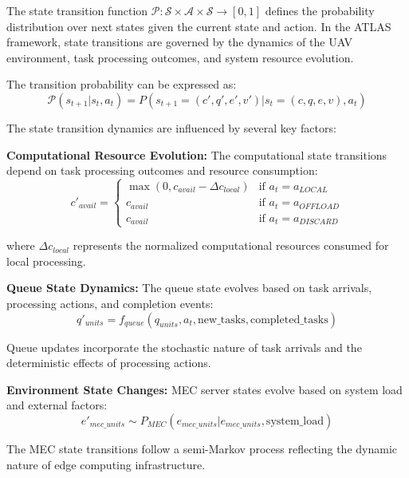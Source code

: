 \documentclass[journal]{IEEEtran}
\begin{document}
The state transition function $\mathcal{P}: \mathcal{S} \times \mathcal{A} \times \mathcal{S} \rightarrow [0,1]$ defines the probability distribution over next states given the current state and action. In the ATLAS framework, state transitions are governed by the dynamics of the UAV environment, task processing outcomes, and system resource evolution.

The transition probability can be expressed as:
\begin{equation}
\mathcal{P}(s_{t+1}|s_t, a_t) = P(s_{t+1} = (c', q', e', v')|s_t = (c, q, e, v), a_t)
\end{equation}

The state transition dynamics are influenced by several key factors:

\textbf{Computational Resource Evolution:} The computational state transitions depend on task processing outcomes and resource consumption:
\begin{equation}
c'_{avail} = \begin{cases}
\max(0, c_{avail} - \Delta c_{local}) & \text{if } a_t = a_{LOCAL} \\
c_{avail} & \text{if } a_t = a_{OFFLOAD} \\
c_{avail} & \text{if } a_t = a_{DISCARD}
\end{cases}
\end{equation}

where $\Delta c_{local}$ represents the normalized computational resources consumed for local processing.

\textbf{Queue State Dynamics:} The queue state evolves based on task arrivals, processing actions, and completion events:
\begin{equation}
q'_{units} = f_{queue}(q_{units}, a_t, \text{new\_tasks}, \text{completed\_tasks})
\end{equation}

Queue updates incorporate the stochastic nature of task arrivals and the deterministic effects of processing actions.

\textbf{Environment State Changes:} MEC server states evolve based on system load and external factors:
\begin{equation}
e'_{mec\_units} \sim P_{MEC}(e_{mec\_units}|e_{mec\_units}, \text{system\_load})
\end{equation}

The MEC state transitions follow a semi-Markov process reflecting the dynamic nature of edge computing infrastructure.
\end{document}
